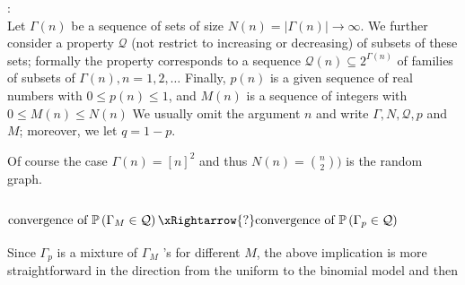 \documentclass{article}
\begin{document}
:\\
Let $\Gamma(n)$ be a sequence of sets of size $N(n)=|\Gamma(n)| \rightarrow \infty$. We further consider a property $\mathcal{Q}$ (not restrict to increasing or decreasing) of subsets of these sets; formally the property corresponds to a sequence $\mathcal{Q}(n) \subseteq 2^{\Gamma(n)}$ of families of subsets of $\Gamma(n), n=1,2, \ldots$ Finally, $p(n)$ is a given sequence of real numbers with $0 \leq p(n) \leq 1$, and $M(n)$ is a sequence of integers with $0 \leq M(n) \leq N(n)$ We usually omit the argument $n$ and write $\Gamma, N, \mathcal{Q}, p$ and $M$; moreover, we let $q=1-p$.
\begin{rema}
Of course the case $\Gamma(n)=[n]^{2}$ and thus $N(n)=\binom{n}{2}) $ is the random graph.
\end{rema}

\subsubsection{$\text{convergence of }\mathbb{P}\left(\Gamma_{M} \in \mathcal{Q}\right)\xRightarrow{?}\text{convergence of } \mathbb{P}\left(\Gamma_{p} \in \mathcal{Q}\right)$}

Since $\Gamma_{p}$ is a mixture of $\Gamma_{M}$ 's for different $M$, the above implication is more straightforward in the direction from the uniform to the binomial model and then  
\end{document}
